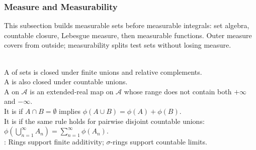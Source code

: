 \subsubsection{Measure and Measurability}

This subsection builds measurable sets before measurable integrals: set algebra, countable closure, Lebesgue measure, then measurable functions. Outer measure covers from outside; measurability splits test sets without losing measure.

\begin{definition} \label{def:measure-measurability-core-source-todo}\label{def:ring-sigma-ring-set-function} \\
A  of sets is closed under finite unions and relative complements.\\
A  is also closed under countable unions.\\
A  on $\mathcal{A}$ is an extended-real map on $\mathcal{A}$ whose range does not contain both $+\infty$ and $-\infty$.\\
It is  if $A\cap B=\emptyset$ implies $\phi(A\cup B)=\phi(A)+\phi(B)$.\\
It is  if the same rule holds for pairwise disjoint countable unions: $\phi\left(\bigcup\limits_{n=1}^{\infty}A_n\right)=\sum\limits_{n=1}^{\infty}\phi(A_n)$.\\
: Rings support finite additivity; $\sigma$-rings support countable limits.
\end{definition}


